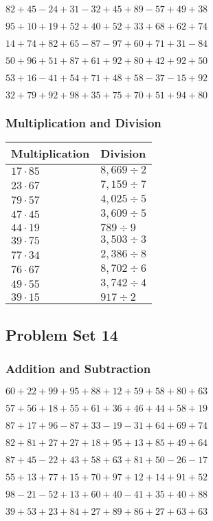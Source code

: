 \(82+45-24+31-32+45+89-57+49+38\)

\(95+10+19+52+40+52+33+68+62+74\)

\(14+74+82+65-87-97+60+71+31-84\)

\(50+96+51+87+61+92+80+42+92+50\)

\(53+16-41+54+71+48+58-37-15+92\)

\(32+79+92+98+35+75+70+51+94+80\)

\hypertarget{multiplication-and-division-53}{%
\subsubsection{Multiplication and
Division}\label{multiplication-and-division-53}}

\begin{longtable}[]{@{}ll@{}}
\toprule
Multiplication & Division\tabularnewline
\midrule
\endhead
\(17\cdot85\) & \(8,669÷2\)\tabularnewline
\(23\cdot67\) & \(7,159÷7\)\tabularnewline
\(79\cdot57\) & \(4,025÷5\)\tabularnewline
\(47\cdot45\) & \(3,609÷5\)\tabularnewline
\(44\cdot19\) & \(789÷9\)\tabularnewline
\(39\cdot75\) & \(3,503÷3\)\tabularnewline
\(77\cdot34\) & \(2,386÷8\)\tabularnewline
\(76\cdot67\) & \(8,702÷6\)\tabularnewline
\(49\cdot55\) & \(3,742÷4\)\tabularnewline
\(39\cdot15\) & \(917÷2\)\tabularnewline
\bottomrule
\end{longtable}

\hypertarget{problem-set-14-1}{%
\subsection{Problem Set 14}\label{problem-set-14-1}}

\hypertarget{addition-and-subtraction-54}{%
\subsubsection{Addition and
Subtraction}\label{addition-and-subtraction-54}}

\(60+22+99+95+88+12+59+58+80+ 63\)

\(57+56+18+55+61+36+46+44+58+19\)

\(87+17+96-87+33-19-31+64+69+74\)

\(82+81+27+27+18+95+13+85+49+64\)

\(87+45-22+43+58+63+81+50-26-17\)

\(55+13+77+15+70+97+12+14+91+52\)

\(98-21-52+13+60+40-41+35+40+88\)

\(39+53+23+84+27+89+86+27+63+63\)

